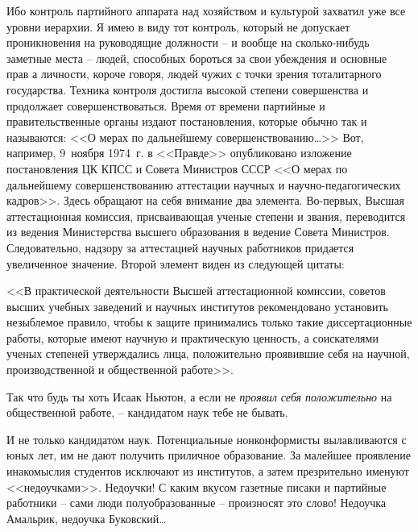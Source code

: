 \documentclass{book}
\begin{document}
Ибо контроль партийного аппарата над хозяйством и культурой захватил уже все уровни иерархии. Я имею в виду тот контроль, который не допускает проникновения на руководящие должности -- и вообще на сколько-нибудь заметные места -- людей, способных бороться за свои убеждения и основные прав а личности, короче говоря, людей чужих с  точки зрения тоталитарного государства. Техника контроля достигла высокой степени совершенства и продолжает совершенствоваться. Время от времени партийные и правительственные органы издают постановления, которые обычно так и называются: <<О мерах по дальнейшему совершенствованию\ldots>> Вот, например, 9~ноября 1974~г. в <<Правде>> опубликовано изложение постановления ЦК КПСС и Совета Министров СССР <<О мерах по дальнейшему совершенствованию аттестации научных и научно-педагогических кадров>>. Здесь обращают на себя внимание два элемента. Во-первых, Высшая аттестационная комиссия, присваивающая ученые степени и звания, переводится из ведения Министерства высшего образования в ведение Совета Министров. Следовательно, надзору за аттестацией научных работников придается увеличенное значение. Второй элемент виден из следующей цитаты:

<<В практической деятельности Высшей аттестационной комиссии, советов высших учебных заведений и научных институтов рекомендовано установить незыблемое правило, чтобы к защите принимались только такие диссертационные работы, которые имеют научную и практическую ценность, а соискате­лями ученых степеней утверждались лица, положительно проявившие себя на научной, производственной и общественной работе>>.

Так что будь ты хоть Исаак Ньютон, а если не \textit{проявил себя положительно} на общественной работе, -- кандидатом наук тебе не бывать.

И не только кандидатом наук. Потенциальные нонконформисты вылавливаются с юных лет, им не дают получить приличное образование. За малейшее проявление инакомыслия студентов исключают из институтов, а затем презрительно именуют <<недоучками>>. Недоучки! С каким вкусом газетные писаки и партийные работники -- сами люди полуобразованные -- произносят это слово! Недоучка Амальрик, недоучка Буковский\ldots
\end{document}
